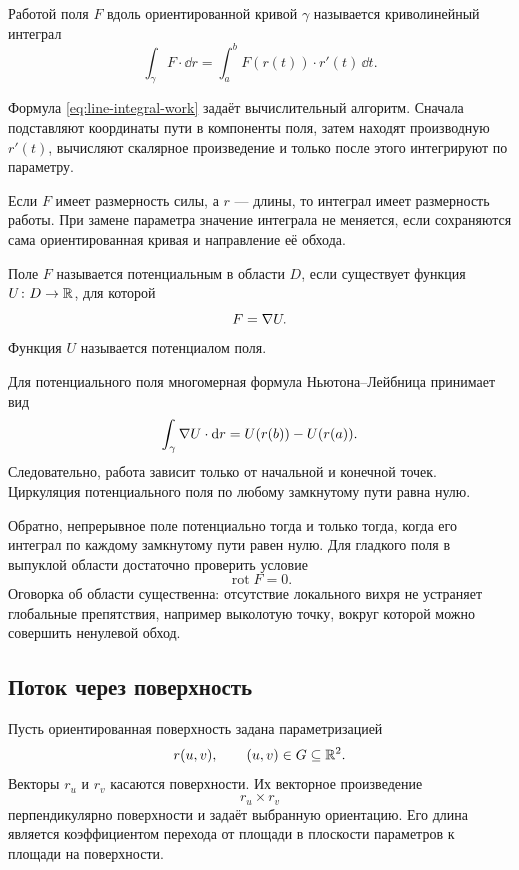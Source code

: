 \begin{definition}
Работой поля $F$ вдоль ориентированной кривой $\gamma$ называется криволинейный интеграл
\begin{equation}
\label{eq:line-integral-work}
\int_{\gamma}F\cdot\dd r
=
\int_a^b
F(r(t))\cdot r'(t)\,\dd t.
\end{equation}
\end{definition}

Формула \eqref{eq:line-integral-work} задаёт вычислительный алгоритм. Сначала подставляют координаты пути в компоненты поля, затем находят производную $r'(t)$, вычисляют скалярное произведение и только после этого интегрируют по параметру.

Если $F$ имеет размерность силы, а $r$ --- длины, то интеграл имеет размерность работы. При замене параметра значение интеграла не меняется, если сохраняются сама ориентированная кривая и направление её обхода.

\begin{definition}
Поле $F$ называется потенциальным в области $D$, если существует функция $U\colon D\to\mathbb{R}$, для которой
\[
F=\nabla U.
\]
Функция $U$ называется потенциалом поля.
\end{definition}

Для потенциального поля многомерная формула Ньютона--Лейбница принимает вид
\begin{equation}
\label{eq:fundamental-line-integral}
\int_{\gamma}\nabla U\cdot\mathop{}\!\mathrm{d} r
=
U(r(b))-U(r(a)).
\end{equation}
Следовательно, работа зависит только от начальной и конечной точек. Циркуляция потенциального поля по любому замкнутому пути равна нулю.

Обратно, непрерывное поле потенциально тогда и только тогда, когда его интеграл по каждому замкнутому пути равен нулю. Для гладкого поля в выпуклой области достаточно проверить условие
\[
\operatorname{rot}F=0.
\]
Оговорка об области существенна: отсутствие локального вихря не устраняет глобальные препятствия, например выколотую точку, вокруг которой можно совершить ненулевой обход.

\subsection{Поток через поверхность}

Пусть ориентированная поверхность задана параметризацией
\[
r(u,v),
\qquad
(u,v)\in G\subseteq\mathbb{R}^2.
\]
Векторы $r_u$ и $r_v$ касаются поверхности. Их векторное произведение
\[
r_u\times r_v
\]
перпендикулярно поверхности и задаёт выбранную ориентацию. Его длина является коэффициентом перехода от площади в плоскости параметров к площади на поверхности.

